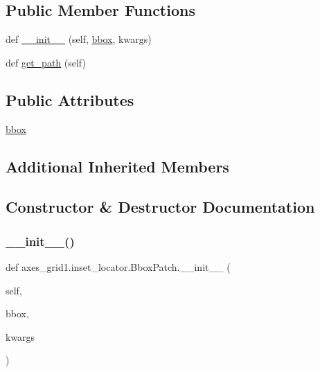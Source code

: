 \subsection*{Public Member Functions}
\begin{DoxyCompactItemize}
\item 
def \hyperlink{classaxes__grid1_1_1inset__locator_1_1BboxPatch_a0d4b588e2b83c219d57af53e41e41581}{\+\_\+\+\_\+init\+\_\+\+\_\+} (self, \hyperlink{classaxes__grid1_1_1inset__locator_1_1BboxPatch_ae24a675e881d5c9de328275f349aa68a}{bbox}, kwargs)
\item 
def \hyperlink{classaxes__grid1_1_1inset__locator_1_1BboxPatch_a0773878ca7c0e4dedb4ff14130e902ca}{get\+\_\+path} (self)
\end{DoxyCompactItemize}
\subsection*{Public Attributes}
\begin{DoxyCompactItemize}
\item 
\hyperlink{classaxes__grid1_1_1inset__locator_1_1BboxPatch_ae24a675e881d5c9de328275f349aa68a}{bbox}
\end{DoxyCompactItemize}
\subsection*{Additional Inherited Members}


\subsection{Constructor \& Destructor Documentation}
\mbox{\label{classaxes__grid1_1_1inset__locator_1_1BboxPatch_a0d4b588e2b83c219d57af53e41e41581}} 
\subsubsection{\texorpdfstring{\+\_\+\+\_\+init\+\_\+\+\_\+()}{\_\_init\_\_()}}
{\footnotesize\ttfamily def axes\+\_\+grid1.\+inset\+\_\+locator.\+Bbox\+Patch.\+\_\+\+\_\+init\+\_\+\+\_\+ (\begin{DoxyParamCaption}\item[{}]{self,  }\item[{}]{bbox,  }\item[{}]{kwargs }\end{DoxyParamCaption})}

